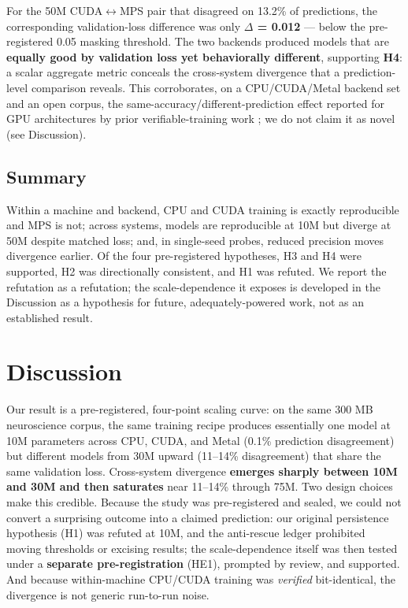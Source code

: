\documentclass{article}
\begin{document}
For the 50M CUDA$\leftrightarrow$MPS pair that disagreed on 13.2\% of predictions, the corresponding
validation-loss difference was only \textbf{\textbar $\Delta$\textbar{} = 0.012} --- below the pre-registered 0.05 masking
threshold. The two backends produced models that are \textbf{equally good by validation loss yet
behaviorally different}, supporting \textbf{H4}: a scalar aggregate metric conceals the
cross-system divergence that a prediction-level comparison reveals. This corroborates, on a
CPU/CUDA/Metal backend set and an open corpus, the same-accuracy/different-prediction effect
reported for GPU architectures by prior verifiable-training work \citep{srivastava2024verifiable}; we
do not claim it as novel (see Discussion).

\subsection{Summary}\label{summary}

Within a machine and backend, CPU and CUDA training is exactly reproducible and MPS is not;
across systems, models are reproducible at 10M but diverge at 50M despite matched loss; and,
in single-seed probes, reduced precision moves divergence earlier. Of the four pre-registered
hypotheses, H3 and H4 were supported, H2 was directionally consistent, and H1 was refuted. We
report the refutation as a refutation; the scale-dependence it exposes is developed in the
Discussion as a hypothesis for future, adequately-powered work, not as an established result.


\section{Discussion}
Our result is a pre-registered, four-point scaling curve: on the same 300 MB neuroscience
corpus, the same training recipe produces essentially one model at 10M parameters across CPU,
CUDA, and Metal (0.1\% prediction disagreement) but different models from 30M upward
(11--14\% disagreement) that share the same validation loss. Cross-system divergence \textbf{emerges
sharply between 10M and 30M and then saturates} near 11--14\% through 75M. Two design choices
make this credible. Because the study was pre-registered and sealed, we could not convert a
surprising outcome into a claimed prediction: our original persistence hypothesis (H1) was
refuted at 10M, and the anti-rescue ledger prohibited moving thresholds or excising results;
the scale-dependence itself was then tested under a \textbf{separate pre-registration} (HE1),
prompted by review, and supported. And because within-machine CPU/CUDA training was \emph{verified}
bit-identical, the divergence is not generic run-to-run noise.
\end{document}
